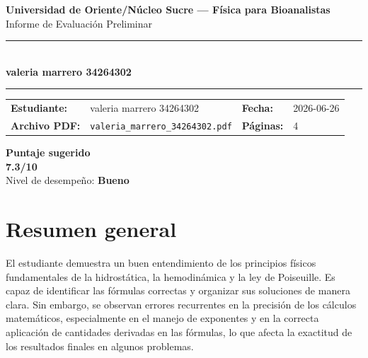 \documentclass[11pt,a4paper]{article}
\begin{document}
\begin{center}
  {\Large\bfseries\color{azulTitulo} Universidad de Oriente/Núcleo Sucre --- Física para Bioanalistas}\\[4pt]
  {\large Informe de Evaluación Preliminar}\\[12pt]
  \rule{\linewidth}{1.2pt}\\[6pt]
  {\LARGE\bfseries valeria marrero 34264302}\\[4pt]
  \rule{\linewidth}{0.6pt}
\end{center}

\vspace{4pt}
\begin{tcolorbox}[cajaTitulo, title=Datos del informe]
\begin{tabular}{@{}llll@{}}
  \textbf{Estudiante:}  & valeria marrero 34264302  &
  \textbf{Fecha:}       & 2026-06-26 \\[4pt]
  \textbf{Archivo PDF:} & \texttt{valeria\_marrero\_34264302.pdf}  &
  \textbf{Páginas:}     & 4 \\
\end{tabular}
\end{tcolorbox}

\vspace{6pt}
\begin{center}
  \begin{tcolorbox}[
    enhanced,
    colback=white, colframe=desempeno_bueno,
    width=0.62\linewidth,
    boxrule=2pt,
    halign=center, valign=center,
    top=8pt, bottom=8pt,
  ]
    \centering
    {\large\bfseries Puntaje sugerido}\\[6pt]
    {\Huge\bfseries\color{desempeno_bueno} 7.3/10}\\[6pt]
    {\large Nivel de desempeño: \textbf{\color{desempeno_bueno} Bueno}}
  \end{tcolorbox}
\end{center}

\section*{Resumen general}
El estudiante demuestra un buen entendimiento de los principios físicos fundamentales de la hidrostática, la hemodinámica y la ley de Poiseuille. Es capaz de identificar las fórmulas correctas y organizar sus soluciones de manera clara. Sin embargo, se observan errores recurrentes en la precisión de los cálculos matemáticos, especialmente en el manejo de exponentes y en la correcta aplicación de cantidades derivadas en las fórmulas, lo que afecta la exactitud de los resultados finales en algunos problemas.
\end{document}
